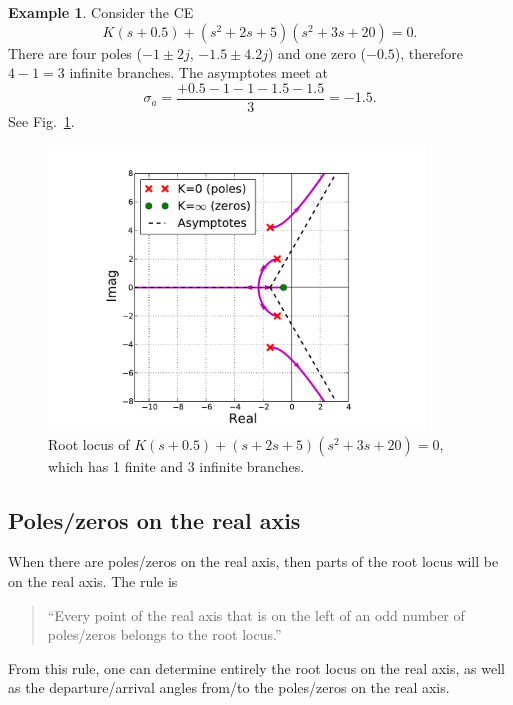 \documentclass[a4paper,11pt]{report}
\theoremstyle{definition}
\newtheorem{mdexample}{Example}
\newenvironment{example}%
  {\vspace{0.1cm}\begin{mdframed}[backgroundcolor=lightgray]\begin{mdexample}}%
  {\end{mdexample}\end{mdframed}\vspace{0.1cm}}
\begin{document}
\begin{example}
  \label{ex:asymp}
  Consider the CE
  \[
  K(s+0.5) + (s^2+2s+5)(s^2+3s+20) = 0.
  \]
  There are four poles ($-1\pm 2j$, $-1.5\pm 4.2j$) and one zero
  ($-0.5$), therefore $4-1 = 3$ infinite branches. The asymptotes meet
  at
  \[
  \sigma_a = \frac{+0.5-1-1-1.5-1.5}{3} = -1.5.
  \]
  See Fig.~\ref{fig:rlocusasymp}.
  \begin{figure}[H]
    \centering
    \includegraphics[width=10cm]{fig/rlocusasymp.pdf}
    \caption{Root locus of $K(s+0.5) + (s+2s+5)(s^2+3s+20) = 0$, which
      has 1 finite and 3 infinite branches.}
    \label{fig:rlocusasymp}
  \end{figure}
\end{example}



\subsection{Poles/zeros on the real axis}

When there are poles/zeros on the real axis, then parts of the root
locus will be on the real axis. The rule is
\begin{quote}
  ``Every point of the real axis that is on the left of an odd number
  of poles/zeros belongs to the root locus.''
\end{quote}

From this rule, one can determine entirely the root locus on the real
axis, as well as the departure/arrival angles from/to the poles/zeros
on the real axis.
\end{document}
